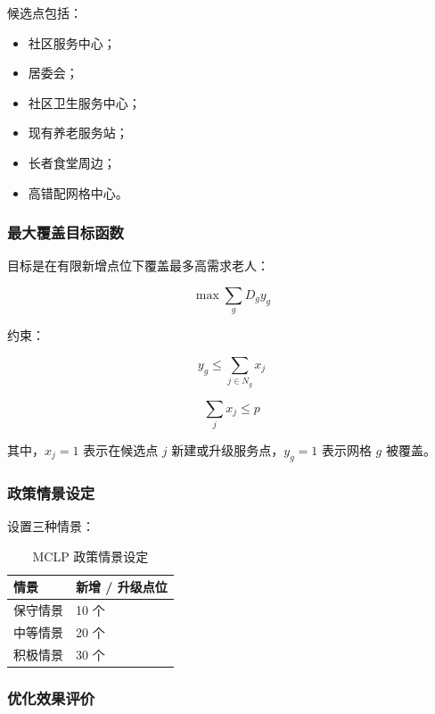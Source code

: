 \documentclass[UTF8,zihao=-4,a4paper,fontset=none]{ctexart}
\begin{document}
候选点包括：

\begin{itemize}
\item 社区服务中心；
\item 居委会；
\item 社区卫生服务中心；
\item 现有养老服务站；
\item 长者食堂周边；
\item 高错配网格中心。
\end{itemize}

\subsubsection{最大覆盖目标函数}

目标是在有限新增点位下覆盖最多高需求老人：

\begin{equation}
\max \sum_g D_g y_g
\end{equation}

约束：

\begin{equation}
y_g \leq \sum_{j \in N_g}x_j
\end{equation}

\begin{equation}
\sum_j x_j \leq p
\end{equation}

其中，$x_j=1$ 表示在候选点 $j$ 新建或升级服务点，$y_g=1$ 表示网格 $g$ 被覆盖。

\subsubsection{政策情景设定}

设置三种情景：

\begin{table}[H]
\centering
\caption{MCLP 政策情景设定}
\begin{tabular}{ll}
\toprule
\rowcolor{tablehead}
情景 & 新增 / 升级点位 \\
\midrule
保守情景 & 10 个 \\
中等情景 & 20 个 \\
积极情景 & 30 个 \\
\bottomrule
\end{tabular}
\end{table}

\subsubsection{优化效果评价}
\end{document}
